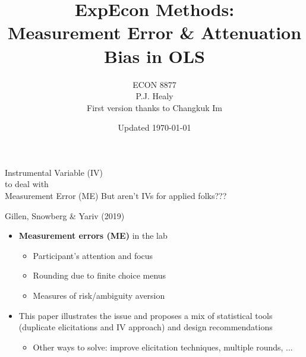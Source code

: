 
\newcommand{\eps}{\varepsilon}

\title[Regressions 2]{ExpEcon Methods:\\Measurement Error \& Attenuation Bias in OLS}
\author[ECON 8877]{ECON 8877\\P.J. Healy\\First version thanks to Changkuk Im} \color{metrop}
\institute[OSU]{}
\date[]{\vfill {\tiny Updated \today}}



\frame{\maketitle}


\begin{frame}
    \huge{\color{blue}Instrumental Variable (IV)}\\
    \vspace{8mm}
    \center\large{\color{blue}to deal with}\\
    \vspace{5mm}
    \hfill\huge{\color{blue}Measurement Error (ME)}
    \br
    \br
    But aren't IVs for applied folks???
\end{frame}

\begin{frame}{Gillen, Snowberg \& Yariv (2019)}
\begin{itemize}
    \item \textbf{Measurement errors (ME)} in the lab
    \begin{itemize}
        \item Participant's attention and focus
        \item Rounding due to finite choice menus
        \item Measures of risk/ambiguity aversion
    \end{itemize}
    \vspace{3mm}
    \item This paper illustrates the issue and proposes a mix of statistical tools (duplicate elicitations and IV approach) and design recommendations
    \begin{itemize}
        \item Other ways to solve: improve elicitation techniques, multiple rounds, ...
    \end{itemize}
\end{itemize}
\end{frame}

